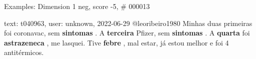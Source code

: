 \begin{frame}{Examples: Dimension 1 neg, score -5, \# 000013}
\footnotesize
\begin{alertblock}{text: t040963, user: unknown, 2022-06-29}
@leoribeiro1980 Minhas duas primeiras foi coronavac, sem \textbf{sintomas} . A 
\textbf{terceira} Pfizer, sem \textbf{sintomas} . A \textbf{quarta} foi 
\textbf{astrazeneca} , me lasquei. Tive \textbf{febre} , mal estar, já estou 
melhor e foi 4 antitérmicos. 
\end{alertblock}
\end{frame}
